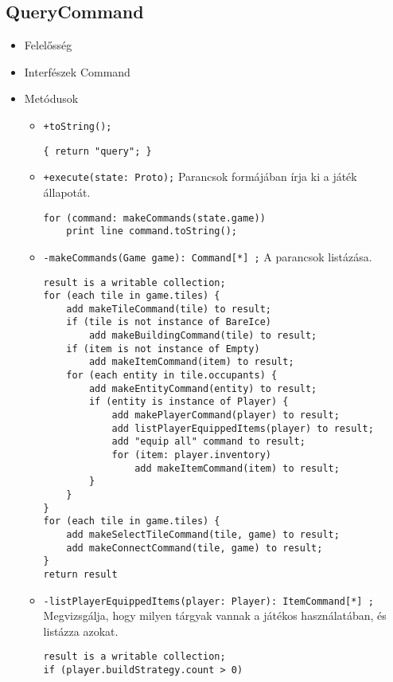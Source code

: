 \subsection{QueryCommand}
\begin{itemize}
\item Felelősség\newline
\item Interfészek\newline
Command
\item Metódusok
\begin{itemize}
		\item \texttt{+toString();}
		\begin{verbatim}{ return "query"; }\end{verbatim}	 
		\item \texttt{+execute(state: Proto);} \newline
		Parancsok formájában írja ki a játék állapotát.		
		\begin{lstlisting}
for (command: makeCommands(state.game))
	print line command.toString();
		\end{lstlisting}
		\item \texttt{-makeCommands(Game game): Command[*] ;} \newline
		A parancsok listázása.
		\begin{lstlisting}
result is a writable collection;
for (each tile in game.tiles) {
	add makeTileCommand(tile) to result;
	if (tile is not instance of BareIce)	
		add makeBuildingCommand(tile) to result;
	if (item is not instance of Empty)
		add makeItemCommand(item) to result;
	for (each entity in tile.occupants) { 
		add makeEntityCommand(entity) to result;
		if (entity is instance of Player) {
			add makePlayerCommand(player) to result;
			add listPlayerEquippedItems(player) to result;
			add "equip all" command to result;
			for (item: player.inventory)
				add makeItemCommand(item) to result;
		}
	}
}	
for (each tile in game.tiles) {
	add makeSelectTileCommand(tile, game) to result;
	add makeConnectCommand(tile, game) to result;
}
return result
		\end{lstlisting}		
		\item \texttt{-listPlayerEquippedItems(player: Player): ItemCommand[*] ;} \newline
		Megvizsgálja, hogy milyen tárgyak vannak a játékos használatában, és listázza azokat.
		\begin{lstlisting}
result is a writable collection;
if (player.buildStrategy.count > 0)

\end{lstlisting}
\end{itemize}
\end{itemize}
